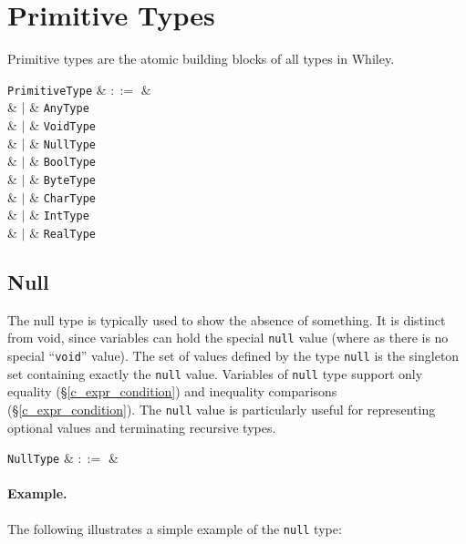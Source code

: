 \section{Primitive Types}
\label{c_types_primitive_types}

Primitive types are the atomic building blocks of all types in Whiley.  

\begin{syntax}
  \verb+PrimitiveType+ & $::=$ & \\
  & $|$ & \verb+AnyType+ \\
  & $|$ & \verb+VoidType+ \\
  & $|$ & \verb+NullType+ \\
  & $|$ & \verb+BoolType+ \\
  & $|$ & \verb+ByteType+ \\
  & $|$ & \verb+CharType+ \\
  & $|$ & \verb+IntType+ \\
  & $|$ & \verb+RealType+ \\
\end{syntax}


\subsection{Null}
\label{c_types_null}

The null type is typically used to show the absence of something. It is distinct from void, since variables can hold the special \lstinline{null} value (where as there is no special ``\lstinline{void}'' value).  The set of values defined by the type \lstinline{null} is the singleton set containing exactly the \lstinline{null} value.  Variables of \lstinline{null} type support only equality (\S\ref{c_expr_condition}) and inequality comparisons (\S\ref{c_expr_condition}).  The \lstinline{null} value is particularly useful for representing optional values and terminating recursive types.

\begin{syntax}
  \verb+NullType+ & $::=$ &  \\
\end{syntax}

\paragraph{Example.} The following illustrates a simple example of the \lstinline{null} type:


